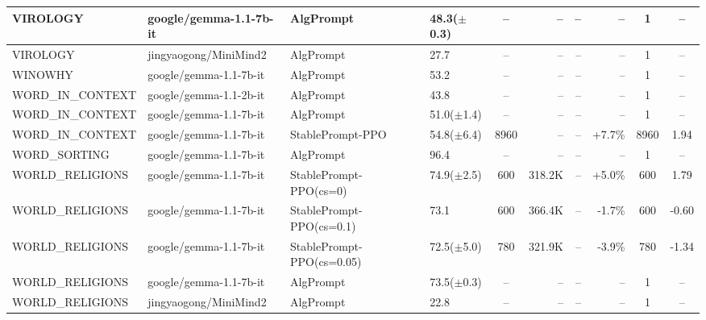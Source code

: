 {\begin{longtable}{@{}p{5.5cm}p{4.5cm}p{2.5cm}lcrrrcc@{}}
VIROLOGY & google/gemma-1.1-7b-it & AlgPrompt & 48.3($\pm$0.3) & -- & -- & -- & -- & 1 & -- \\
\midrule
VIROLOGY & jingyaogong/MiniMind2 & AlgPrompt & 27.7 & -- & -- & -- & -- & 1 & -- \\
\midrule
WINOWHY & google/gemma-1.1-7b-it & AlgPrompt & 53.2 & -- & -- & -- & -- & 1 & -- \\
\midrule
WORD\_IN\_CONTEXT & google/gemma-1.1-2b-it & AlgPrompt & 43.8 & -- & -- & -- & -- & 1 & -- \\
\midrule
WORD\_IN\_CONTEXT & google/gemma-1.1-7b-it & AlgPrompt & 51.0($\pm$1.4) & -- & -- & -- & -- & 1 & -- \\
WORD\_IN\_CONTEXT & google/gemma-1.1-7b-it & StablePrompt-PPO & 54.8($\pm$6.4) & 8960 & -- & -- & +7.7\% & 8960 & 1.94 \\
\midrule
WORD\_SORTING & google/gemma-1.1-7b-it & AlgPrompt & 96.4 & -- & -- & -- & -- & 1 & -- \\
\midrule
WORLD\_RELIGIONS & google/gemma-1.1-7b-it & StablePrompt-PPO(cs=0) & 74.9($\pm$2.5) & 600 & 318.2K & -- & +5.0\% & 600 & 1.79 \\
WORLD\_RELIGIONS & google/gemma-1.1-7b-it & StablePrompt-PPO(cs=0.1) & 73.1 & 600 & 366.4K & -- & -1.7\% & 600 & -0.60 \\
WORLD\_RELIGIONS & google/gemma-1.1-7b-it & StablePrompt-PPO(cs=0.05) & 72.5($\pm$5.0) & 780 & 321.9K & -- & -3.9\% & 780 & -1.34 \\
WORLD\_RELIGIONS & google/gemma-1.1-7b-it & AlgPrompt & 73.5($\pm$0.3) & -- & -- & -- & -- & 1 & -- \\
\midrule
WORLD\_RELIGIONS & jingyaogong/MiniMind2 & AlgPrompt & 22.8 & -- & -- & -- & -- & 1 & -- \\
\bottomrule
\end{longtable}
}
